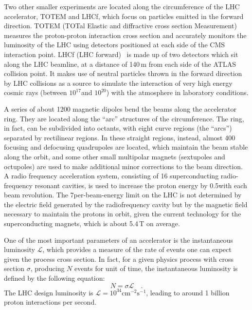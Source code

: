 Two other smaller experiments are located along the circumference of the LHC accelerator, TOTEM and LHCf, which focus on particles emitted in the forward direction. TOTEM (TOTal Elastic and diffractive cross section Measurement)~\cite{Anelli:2008zza} measures the proton-proton interaction cross section and accurately monitors the luminosity of the LHC using detectors positioned at each side of the CMS interaction point. LHCf (LHC forward)~\cite{Adriani:2008zz} is made up of two detectors which sit along the LHC beamline, at a distance of 140\,m from each side of the ATLAS collision point. It makes use of neutral particles thrown in the forward direction by LHC collisions as a source to simulate the interaction of very high energy cosmic rays (between $10^{17}$\TeV and $10^{20}$\TeV) with the atmosphere in laboratory conditions.

A series of about 1200 magnetic dipoles bend the beams along the accelerator ring. They are located along the ``arc'' structures of the circumference. The ring, in fact, can be subdivided into octants, with eight curve regions (the ``arcs'') separated by rectilinear regions. In these straight regions, instead, almost 400 focusing and defocusing quadrupoles are located, which maintain the beam stable along the orbit, and some other small multipolar magnets (sextupoles and octupoles) are used to make additional minor corrections to the beam direction. A radio frequency acceleration system, consisting of 16 superconducting radio-frequency resonant cavities, is used to increase the proton energy by 0.5\MeV with each beam revolution. The 7\TeV per-beam-energy limit on the LHC is not determined by the electric field generated by the radiofrequency cavity but by the magnetic field necessary to maintain the protons in orbit, given the current technology for the superconducting magnets, which is about 5.4\,T on average.

One of the most important parameters of an accelerator is the instantaneous luminosity $\mathcal{L}$, which provides a measure of the rate of events one can expect given the process cross section. In fact, for a given physics process with cross section $\sigma$, producing $N$ events for unit of time, the instantaneous luminosity is defined by the following equation:
\begin{equation}
N = \sigma\mathcal{L} \quad .
\end{equation}
The LHC design luminosity is $\mathcal{L} = 10^{34} \mathrm{cm^{-2} s^{-1}}$, leading to around 1 billion proton interactions per second.

